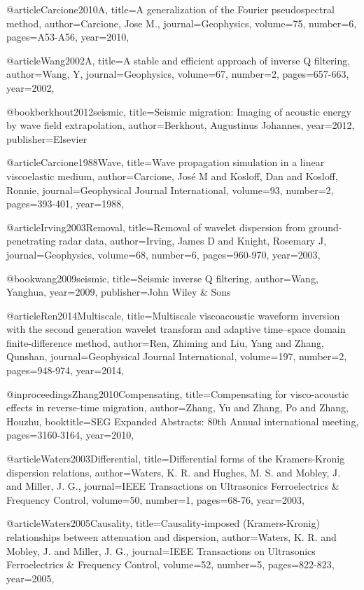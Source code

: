 @article{Carcione2010A,
  title={A generalization of the {F}ourier pseudospectral method},
  author={Carcione, Jose M.},
  journal={Geophysics},
  volume={75},
  number={6},
  pages={A53-A56},
  year={2010},
}

@article{Wang2002A,
  title={A stable and efficient approach of inverse {Q} filtering},
  author={Wang, Y},
  journal={Geophysics},
  volume={67},
  number={2},
  pages={657-663},
  year={2002},
}

@book{berkhout2012seismic,
  title={Seismic migration: Imaging of acoustic energy by wave field extrapolation},
  author={Berkhout, Augustinus Johannes},
  year={2012},
  publisher={Elsevier}
}

@article{Carcione1988Wave,
  title={Wave propagation simulation in a linear viscoelastic medium},
  author={Carcione, José M and Kosloff, Dan and Kosloff, Ronnie},
  journal={Geophysical Journal International},
  volume={93},
  number={2},
  pages={393-401},
  year={1988},
}

@article{Irving2003Removal,
  title={Removal of wavelet dispersion from ground-penetrating radar data},
  author={Irving, James D and Knight, Rosemary J},
  journal={Geophysics},
  volume={68},
  number={6},
  pages={960-970},
  year={2003},
}

@book{wang2009seismic,
  title={Seismic inverse {Q} filtering},
  author={Wang, Yanghua},
  year={2009},
  publisher={John Wiley \& Sons}
}

@article{Ren2014Multiscale,
  title={Multiscale viscoacoustic waveform inversion with the second generation wavelet transform and adaptive time–space domain finite-difference method},
  author={Ren, Zhiming and Liu, Yang and Zhang, Qunshan},
  journal={Geophysical Journal International},
  volume={197},
  number={2},
  pages={948-974},
  year={2014},
}

@inproceedings{Zhang2010Compensating,
  title={Compensating for visco-acoustic effects in reverse-time migration},
  author={Zhang, Yu and Zhang, Po and Zhang, Houzhu},
  booktitle={SEG Expanded Abstracts: 80th Annual international meeting},
  pages={3160-3164},
  year={2010},
}

@article{Waters2003Differential,
  title={Differential forms of the Kramers-Kronig dispersion relations},
  author={Waters, K. R. and Hughes, M. S. and Mobley, J. and Miller, J. G.},
  journal={IEEE Transactions on Ultrasonics Ferroelectrics \& Frequency Control},
  volume={50},
  number={1},
  pages={68-76},
  year={2003},
}

@article{Waters2005Causality,
  title={Causality-imposed (Kramers-Kronig) relationships between attenuation and dispersion},
  author={Waters, K. R. and Mobley, J. and Miller, J. G.},
  journal={IEEE Transactions on Ultrasonics Ferroelectrics \& Frequency Control},
  volume={52},
  number={5},
  pages={822-823},
  year={2005},
}

